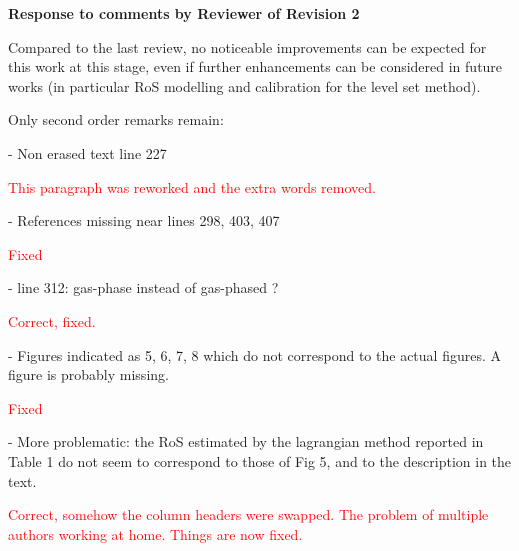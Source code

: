 \documentclass[12pt]{article}
\newcommand\hl[1]{\textcolor{red}{#1}}
\begin{document}
\begin{center}
{\bf Response to comments by Reviewer of Revision 2}
\end{center}

Compared to the last review, no noticeable improvements can be expected for this work at this stage, even if further enhancements can be considered in future works (in particular RoS modelling and calibration for the level set method).

Only second order remarks remain:

- Non erased text line 227

\hl{This paragraph was reworked and the extra words removed.}


- References missing near lines 298, 403, 407

\hl{Fixed}


- line 312: gas-phase instead of gas-phased ?

\hl{Correct, fixed.}

- Figures indicated as 5, 6, 7, 8 which do not correspond to the actual figures. A figure is probably missing.

\hl{Fixed}

- More problematic: the RoS estimated by the lagrangian method reported in Table 1 do not seem to correspond to those of Fig 5, and to the description in the text.

\hl{Correct, somehow the column headers were swapped. The problem of multiple authors working at home. Things are now fixed.}
\end{document}
